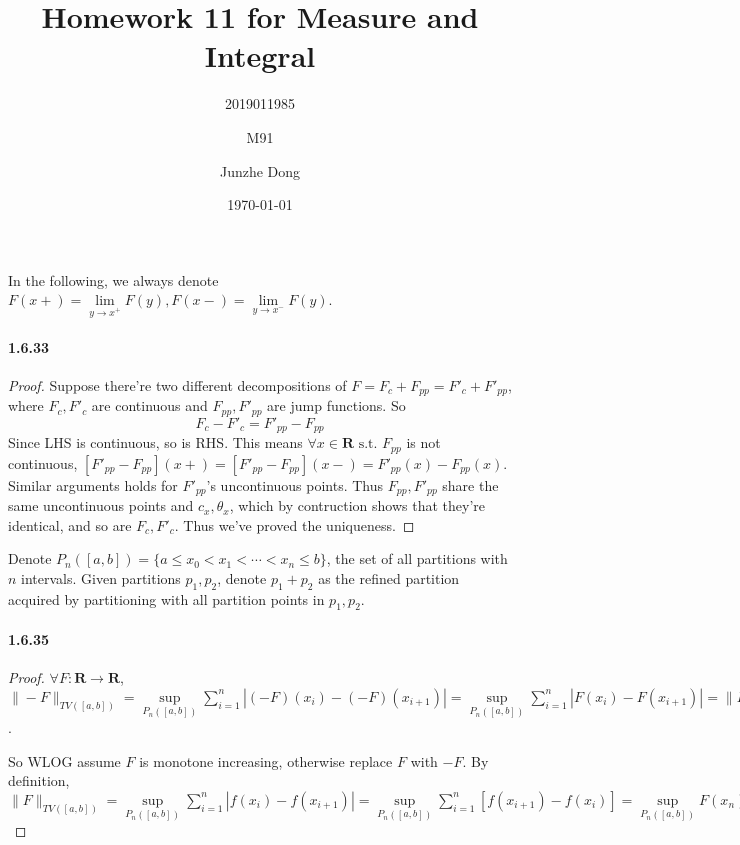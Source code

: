 \documentclass{article}
\title{Homework 11 for Measure and Integral}
\author{2019011985\and M91 \and Junzhe Dong}
\date{\today}
\begin{document}
\newcommand{\st}{\text{ s.t. }}
\newcommand{\R}{\mathbf{R}}
\newcommand{\dd}{\,\mathrm{d}}

\maketitle

In the following, we always denote $F(x+)=\lim\limits_{y\to x^+}F(y),F(x-)=\lim\limits_{y\to x^-}F(y)$.

\paragraph{1.6.33}
\begin{proof}
Suppose there're two different decompositions of $F=F_c+F_{pp}=F'_c+F'_{pp}$, where $F_c, F'_c$ are continuous and $F_{pp},F'_{pp}$ are jump functions. So 
\[F_c-F'_c=F'_{pp}-F_{pp}\]
Since LHS is continuous, so is RHS. This means $\forall x\in\R\st F_{pp}$ is not continuous, $[F'_{pp}-F_{pp}](x+)=[F'_{pp}-F_{pp}](x-)=F'_{pp}(x)-F_{pp}(x)$. Similar arguments holds for $F'_{pp}$'s uncontinuous points. Thus $F_{pp},F'_{pp}$ share the same uncontinuous points and $c_x, \theta_x$, which by contruction shows that they're identical, and so are $F_c, F'_c$. Thus we've proved the uniqueness.
\end{proof}

Denote $P_n([a,b])=\{a\leq x_0<x_1<\cdots<x_n\leq b\}$, the set of all partitions with $n$ intervals. Given partitions $p_1,p_2$, denote $p_1+p_2$ as the refined partition acquired by partitioning with all partition points in $p_1,p_2$.

\paragraph{1.6.35}
\begin{proof}
$\forall F:\R\to \R$, $\|-F\|_{TV([a,b])}=\sup\limits_{P_n([a,b])}\sum\limits_{i=1}^n|(-F)(x_i)-(-F)(x_{i+1})|=\sup\limits_{P_n([a,b])}\sum\limits_{i=1}^n|F(x_i)-F(x_{i+1})|=\|F\|_{TV([a,b])}$.

So WLOG assume $F$ is monotone increasing, otherwise replace $F$ with $-F$. By definition, $\|F\|_{TV([a,b])}=\sup\limits_{P_n([a,b])}\sum\limits_{i=1}^n|f(x_i)-f(x_{i+1})|=\sup\limits_{P_n([a,b])}\sum\limits_{i=1}^n[f(x_{i+1})-f(x_{i})]=\sup\limits_{P_n([a,b])}F(x_n)-F(x_0)=F(b)-F(a)=\left|F(b)-F(a)\right|$
\end{proof}
\end{document}
